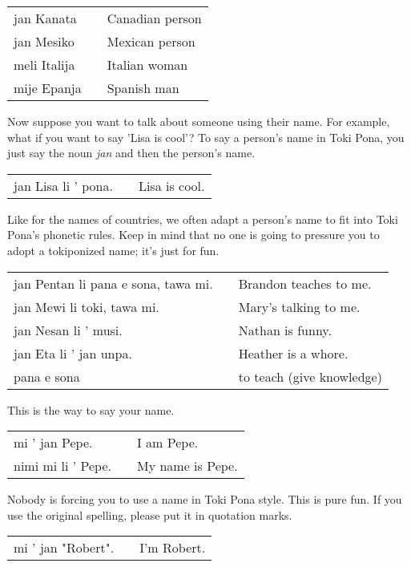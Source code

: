 \begin{supertabular}{p{5,5cm}|ll}
jan Kanata && Canadian person \\
jan Mesiko && Mexican person \\
meli Italija && Italian woman \\
mije Epanja && Spanish man \\
\end{supertabular} 

Now suppose you want to talk about someone using their name. 
For example, what if you want to say 'Lisa is cool'? 
To say a person's name in Toki Pona, you just say the noun \textit{jan} and then the person's name. 

\begin{supertabular}{p{5,5cm}|ll}
jan Lisa li ' pona. && Lisa is cool. \\
\end{supertabular} 

Like for the names of countries, we often adapt a person's name to fit into Toki Pona's phonetic rules. 
Keep in mind that no one is going to pressure you to adopt a tokiponized name; it's just for fun. 

\begin{supertabular}{p{5,5cm}|ll}
jan Pentan li pana e sona, tawa mi. && Brandon teaches to me. \\
jan Mewi li toki, tawa mi. && Mary's talking to me. \\
jan Nesan li ' musi. && Nathan is funny. \\
jan Eta li ' jan unpa. && Heather is a whore. \\
pana e sona && to teach (give knowledge) \\
\end{supertabular} 

This is the way to say your name. 

\begin{supertabular}{p{5,5cm}|ll}
mi ' jan Pepe. && I am Pepe. \\
nimi mi li ' Pepe. && My name is Pepe. 
\end{supertabular} 

Nobody is forcing you to use a name in Toki Pona style.
This is pure fun.
If you use the original spelling, please put it in quotation marks.

\begin{supertabular}{p{5,5cm}|ll}
mi ' jan "Robert". && I'm Robert. \\
\end{supertabular} 
%
